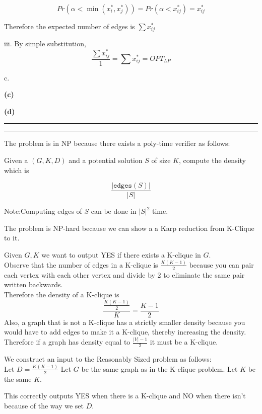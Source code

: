 \documentclass[11pt]{article}
\newcommand{\question}[2] {\vspace{.25in} \hrule\vspace{0.5em}
\noindent{\bf #1: #2} \vspace{0.5em}
\hrule \vspace{.10in}}
\renewcommand{\part}[1] {\vspace{.10in} {\bf (#1)}}
\begin{document}
$$Pr(\alpha < \min(x^*_i, x^*_j)) = Pr(\alpha < x^*_{ij}) = x^*_{ij}$$

Therefore the expected number of edges is $\sum x^*_{ij}$

iii. By simple substitution,
$$ \frac{\sum x^*_{ij}}{1} = \sum x^*_{ij} = OPT_{LP}$$

c.




\part{c}

\part{d}

\question{2}{Large + Dense = Difficult}
The problem is in NP because there exists a poly-time verifier as follows:

Given a $(G, K, D)$ and a potential solution $S$ of size $K$, compute the density which is

$$\frac{| \texttt{edges}(S) |}{|S|}$$

Note:Computing edges of $S$ can be done in $|S|^2$ time.

The problem is NP-hard because we can show a a Karp reduction from K-Clique to it.

Given $G, K$ we want to output YES if there exists a K-clique in $G$.\\

Observe that the number of edges in a K-clique is $\frac{K(K-1)}{2}$ because you can pair each vertex with each other vertex and divide by 2 to eliminate the same pair written backwards.\\
Therefore the density of a K-clique is $$\frac{\frac{K(K-1)}{2}}{K} = \frac{K-1}{2}$$
Also, a graph that is not a K-clique has a strictly smaller density because you would have to add edges to make it a K-clique, thereby increasing the density.\\
Therefore if a graph has density equal to $\frac{|V| - 1}{2}$ it must be a K-clique.

We construct an input to the Reasonably Sized problem as follows:\\
Let $D = \frac{K(K-1)}{2}$
Let $G$ be the same graph as in the K-clique problem.
Let $K$ be the same $K$.

This correctly outputs YES when there is a K-clique and NO when there isn't because of the way we set $D$.
\end{document}
